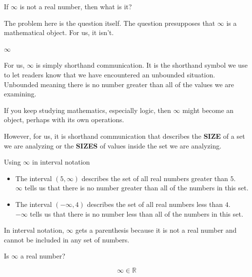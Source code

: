 \documentclass{ximera}
\begin{document}
If $\infty$ is not a real number, then what is it?


The problem here is the question itself.  The question presupposes that $\infty$ is a mathematical object.  For us, it isn't.   



\begin{definition} \textbf{\textcolor{green!50!black}{$\infty$}}

For us, $\infty$ is simply shorthand communication.  It is the shorthand symbol we use to let readers know that we have encountered an unbounded situation. Unbounded meaning there is no number greater than all of the values we are examining.

\end{definition}


If you keep studying mathematics, especially logic, then $\infty$ might become an object, perhaps with its own operations.

However, for us, it is shorthand communication that describes the \textbf{SIZE} of a set we are analyzing or the \textbf{SIZES} of values inside the set we are analyzing.







\begin{example} Using $\infty$ in interval notation


\begin{itemize}
\item The interval $(5, \infty)$ describes the set of all real numbers greater than $5$.  \\
$\infty$ tells us that there is no number greater than all of the numbers in this set.



\item The interval $(-\infty, 4)$ describes the set of all real numbers less than $4$.  \\
$-\infty$ tells us that there is no number less than all of the numbers in this set.
\end{itemize}




\end{example}
In interval notation, $\infty$ gets a parenthesis because it is not a real number and cannot be included in any set of numbers.






\begin{question} 


Is $\infty$ a real number?

\[  \infty \in \mathbb{R}  \]


\begin{multipleChoice}
\end{multipleChoice}


\end{question}
\end{document}
